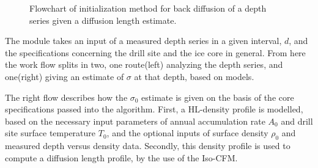 \documentclass[../../CompleteThesis2/Complete_2ndDraft]{subfiles}
\begin{document}
\begin{figure}[!htb]
	\caption[Flowchart of initialization method.]{\small Flowchart of initialization method for back diffusion of a depth series given a diffusion length estimate.}
	\label{Fig:FlowchartBackDiffusion}
\end{figure}
The module takes an input of a measured depth series in a given interval, $d$, and the specifications concerning the drill site and the ice core in general. From here the work flow splits in two, one route(left) analyzing the depth series, and one(right) giving an estimate of $\sigma$ at that depth, based on models.

The right flow describes how the $\sigma_0$ estimate is given on the basis of the core specifications passed into the algorithm. First, a HL-density profile is modelled, based on the necessary input parameters of annual accumulation rate $A_0$ and drill site surface temperature $T_0$, and the optional inputs of surface density $\rho_0$ and measured depth versus density data. Secondly, this density profile is used to compute a diffusion length profile, by the use of the Iso-CFM. 
\end{document}
